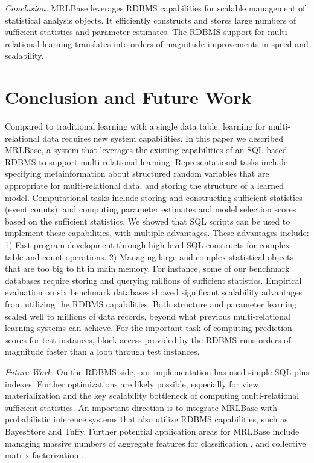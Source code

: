 \documentclass{acm_proc_article-sp}
\begin{document}
{\em Conclusion.} MRLBase leverages RDBMS capabilities for scalable management of statistical analysis objects. It efficiently constructs and stores large numbers of sufficient statistics and parameter estimates. 
The RDBMS support for multi-relational learning translates into orders of magnitude improvements in speed and scalability.


\section{Conclusion and Future Work} 
Compared to traditional learning with a single data table, learning for multi-relational data requires new system capabilities. In this paper we described MRLBase, a system that leverages the existing capabilities of an SQL-based RDBMS to support multi-relational learning. Representational tasks include specifying metainformation about structured random variables that are appropriate for multi-relational data, and storing the structure of a learned model. Computational tasks include storing and constructing sufficient statistics (event counts), and computing parameter estimates and model selection scores based on the sufficient statistics. 
We showed that SQL scripts can be used to implement these capabilities, with multiple advantages. These advantages include: 1) Fast program development through high-level SQL constructs for complex table and count operations. 2) Managing large and complex statistical objects that are too big to fit in main memory. For instance, some of our benchmark databases require storing and querying millions of sufficient statistics. Empirical evaluation on six benchmark databases showed significant scalability advantages from utilizing the RDBMS capabilities: Both structure and parameter learning scaled well to millions of data records, beyond what previous multi-relational learning systems can achieve. For the important task of computing prediction scores for test instances, block access provided by the RDBMS runs orders of magnitude faster than a loop through test instances. 

{\em Future Work.} On the RDBMS side, our implementation has used simple SQL plus indexes. Further optimizations are likely possible, especially for view materialization and the key scalability bottleneck of computing multi-relational sufficient statistics. An important direction is to integrate MRLBase with probabilistic inference systems that also utilize RDBMS capabilities, such as BayesStore and Tuffy. Further potential application areas for MRLBase include managing massive numbers of aggregate features for classification \cite{Popescul2007}, and collective matrix factorization \cite{Singh2008}. 
\end{document}
